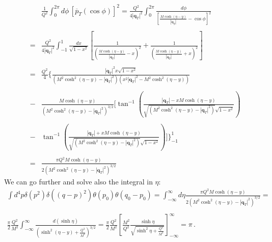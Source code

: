 \documentclass[10pt,a4paper]{article}
\begin{document}
\begin{equation}
\begin{array}{rcl}
&&\displaystyle
  \frac{1}{Q^2}\int_0^{2\pi}d\phi\,[\overline{p}_T(\cos\phi)]^2 =
                                                                    \displaystyle
                                                                    \frac{Q^2}{4
                                                                    |\mathbf{q}_T|^2}\int_0^{2\pi}\frac{d\phi}{\left[\frac{M\cosh\left(\eta
                                                                    -
                                                                    y\right)}{|\mathbf{q}_T|}-\cos\phi\right]^2}\\
\\
&=&\displaystyle \frac{Q^2}{4|\mathbf{q}_T|^2}\int_{-1}^{1}\frac{dx}{\sqrt{1-x^2}}\left[\frac{1}{\left(\frac{M\cosh\left(\eta- y\right)}{|\mathbf{q}_T|}-x\right)^2}+\frac{1}{\left(\frac{M\cosh\left(\eta- y\right)}{|\mathbf{q}_T|}+x\right)^2}\right]\\
\\
&=&\displaystyle \frac{Q^2}{4}\Bigg\{\frac{|\mathbf{q}_T|^2 x\sqrt{1-x^2}}{(M ^2\cosh ^2\left(\eta- y\right)-|\mathbf{q}_T|^2)(x^2 |\mathbf{q}_T|^2-
  M ^2\cosh ^2\left(\eta- y\right))}\\
\\
&-&\displaystyle \frac{M\cosh\left(\eta-
    y\right)}{(M^2\cosh^2\left(\eta-
    y\right)-|\mathbf{q}_T|^2)^{3/2}}\Bigg[\tan^{-1}\left(\frac{|\mathbf{q}_T|-
    xM\cosh\left(\eta-y\right)}{\sqrt{(M^2\cosh^2\left(\eta-y\right)-|\mathbf{q}_T|^2)}\sqrt{1-x^2}}\right)\\
\\
&-&\displaystyle\tan^{-1}\left(\frac{|\mathbf{q}_T|+
    xM\cosh\left(\eta-y\right)}{\sqrt{(M^2\cosh^2\left(\eta-y\right)-|\mathbf{q}_T|^2)}\sqrt{1-x^2}}\right)\Bigg]\Bigg\}_{-1}^{1}\\
\\
&=&\displaystyle \frac{\pi
  Q^2M\cosh\left(\eta -
    y\right)}{2(M^2\cosh^2\left(\eta -
    y\right)-|\mathbf{q}_T|^2)^{3/2}}
\end{array}
\end{equation}
We can go further and solve also the integral in $\eta$:
\begin{equation}\label{eq:remarkableintegral}
\begin{array}{l}
  \displaystyle \int d^4p \delta(p^2) \delta((q-p)^2) \theta(p_{0})
  \theta(q_0-p_{0})=\int_{-\infty}^\infty
  d\eta\frac{\pi Q^2M\cosh(\eta-y)}{2(M^2\cosh^2(\eta-y)-|\mathbf{q}_T|^2)^{3/2}}= \\
  \\
  \displaystyle\frac{\pi }{2}\frac{Q^2}{M^2}\int_{-\infty}^\infty
  \frac{d(\sinh\eta)}{\left(\sinh^2(\eta-y)+\frac{Q^2}{M^2}\right)^{3/2}}= \frac{\pi}{2} \frac{Q^2}{M^2}\left[\frac{M^2}{Q^2}\frac{\sinh\eta}{\sqrt{\sinh^2\eta+\frac{Q^2}{M^2}}}\right]_{-\infty}^{\infty}= \pi\,.
\end{array}
\end{equation}
\end{document}
